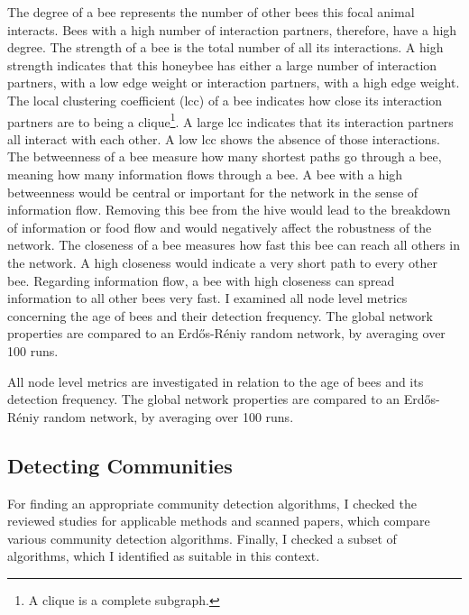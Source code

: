 The degree of a bee represents the number of other bees this focal animal interacts.
Bees with a high number of interaction partners, therefore, have a high degree.
The strength of a bee is the total number of all its interactions. A high strength indicates that this honeybee has either a large number of interaction partners, with a low edge weight or interaction partners, with a high edge weight.
The local clustering coefficient (lcc) of a bee indicates how close its interaction partners are to being a clique\footnote{A clique is a complete subgraph.}. A large lcc indicates that its interaction partners all interact with each other. A low lcc shows the absence of those interactions.
The betweenness of a bee measure how many shortest paths go through a bee, meaning how many information flows through a bee. A bee with a high betweenness would be central or important for the network in the sense of information flow. Removing
this bee from the hive would lead to the breakdown of information or food flow and would negatively affect the robustness of the network.
The closeness of a bee measures how fast this bee can reach all others in the network. A high closeness would indicate a very short path to every other bee. Regarding information flow, a bee with high closeness can spread information to all other bees
very fast.
I examined all node level metrics concerning the age of bees and their detection frequency. The global network properties are compared to an Erdős-Réniy random network, by averaging over 100 runs.

All node level metrics are investigated in relation to the age of bees and its detection frequency.
The global network properties are compared to an Erd\H{o}s-R\'{e}niy random network, by averaging over 100 runs.\\




\subsection{Detecting Communities}
\label{subsec:APcommunityDet}
For finding an appropriate community detection algorithms, I checked the reviewed studies for applicable methods and scanned papers, which compare various community detection algorithms. Finally, I checked a subset of algorithms, which I identified as suitable in this context.

